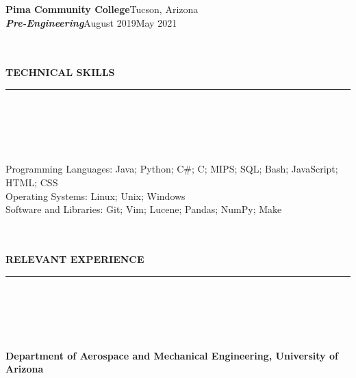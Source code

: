\documentclass[10pt]{book}
\begin{document}
{        {
            \fontsize{11}{11}
            \selectfont
            \noindent\textbf{Pima Community College}\hfill Tucson, Arizona
            \\
            \textbf{\textit{Pre-Engineering}}\hfill August 2019\hspace{3pt}\textendash\hspace{3pt}May 2021
            \\
        }
        \vspace{-\baselineskip}\vspace{-\parskip}
        \begin{spacing}{0.2}
            {
                \noindent\fontsize{12}{12}
                \\
                \\
                \selectfont\textbf{TECHNICAL SKILLS}
                \\
            }
            \rule{\linewidth}{0.4pt}
            \\
            \\
            \\
            \\
        \end{spacing}
        \noindent
        Programming Languages: Java; Python; C\#; C; MIPS; SQL; Bash; JavaScript; HTML; CSS
        \\
        Operating Systems: Linux; Unix; Windows
        \\
        Software and Libraries: Git; Vim; Lucene; Pandas; NumPy; Make
        \begin{spacing}{0.2}
            {
                \noindent\fontsize{12}{12}
                \\
                \\
                \selectfont\textbf{RELEVANT EXPERIENCE}
                \\
            }
            \rule{\linewidth}{0.4pt}
            \\
            \\
            \\
            \\
        \end{spacing}
        {
            \noindent\fontsize{11}{11}
            \selectfont\hspace{-3pt}\textbf{Department of Aerospace and Mechanical Engineering, University of Arizona \textendash}
}}
\end{document}
